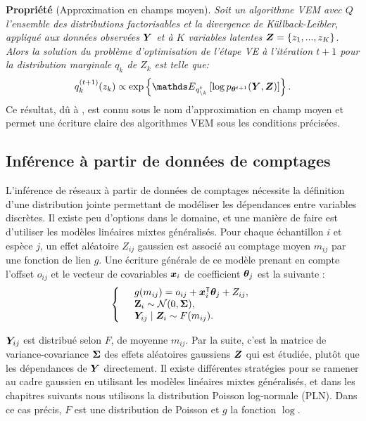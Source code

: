 \textbf{Propriété} (Approximation en champs moyen). \textit{Soit un algorithme VEM avec $Q$  l'ensemble des distributions factorisables et la divergence de Küllback-Leibler, appliqué aux données observées ${\boldsymbol{Y}}$ et à  $K$ variables latentes ${\boldsymbol{Z}}=\{z_1,...,z_K\}$. Alors la solution du problème d'optimisation de l'étape VE à l'itération $t+1$ pour la distribution marginale $q_k$ de $Z_k$ est telle que:
$$ q_k^{(t+1)}(z_k)  \propto \exp \left\{ \Esp_{q_{\setminus k}^t} \left[ \log p_{\thetabf^{t+1}}(\Ybf, \Zbf) \right] \right\}.$$}
Ce résultat, dû à \citet{beal}, est connu sous le nom d'approximation en champ moyen et permet une écriture claire des algorithmes VEM sous les conditions précisées.

\subsection*{Inférence à partir de données de comptages}
L'inférence de réseaux à partir de données de comptages nécessite la définition d'une distribution jointe permettant de modéliser les dépendances entre variables discrètes. Il existe peu d'options dans le domaine, et une manière de faire est d'utiliser les modèles linéaires mixtes  généralisés. Pour chaque échantillon $i$ et espèce $j$, un effet aléatoire $Z_{ij}$ gaussien est associé au comptage moyen $m_{ij}$ par une fonction de lien $g$. Une écriture générale de ce modèle prenant en compte l'offset $o_{ij}$ et le vecteur de covariables ${\boldsymbol{x}}_i$ de coefficient ${\boldsymbol{\theta}}_j$ est la suivante :
 \begin{equation*}
 \left\{ \begin{array}{ll}
 &g(m_{ij}) = o_{ij}+{\boldsymbol{x}}_i^\intercal  {\boldsymbol{\theta}}_j + Z_{ij},\\
&{\bf Z}_i \sim \mathcal{N}(0, {\boldsymbol{\Sigma}}),\\
 &{\boldsymbol{Y}}_{ij}\mid{\boldsymbol{Z}}_i \sim F(m_{ij}).
 \end{array} \right. 
 \end{equation*}
 
${\boldsymbol{Y}}_{ij}$ est distribué selon $F$, de moyenne $m_{ij}$. Par la suite, c'est la matrice de variance-covariance  ${\boldsymbol{\Sigma}}$ des effets aléatoires gaussiens ${\boldsymbol{Z}}$ qui est étudiée, plutôt que les dépendances de ${\boldsymbol{Y}}$ directement. Il existe différentes stratégies pour se ramener au cadre gaussien en utilisant les modèles linéaires mixtes généralisés, et dans les chapitres suivants nous utilisons la distribution Poisson log-normale (PLN). Dans ce cas précis, $F$ est une distribution de Poisson et $g$ la fonction $\log$.



